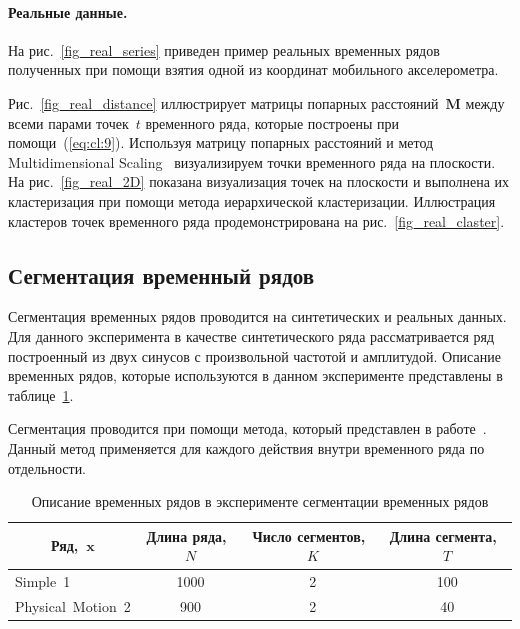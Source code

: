 \paragraph{Реальные данные.}

На рис.~\ref{fig_real_series} приведен пример реальных временных рядов полученных при помощи взятия одной из координат мобильного акселерометра. 

Рис.~\ref{fig_real_distance} иллюстрирует матрицы попарных расстояний~$\textbf{M}$ между всеми парами точек~$t$ временного ряда, которые построены при помощи~(\ref{eq:cl:9}). 
Используя матрицу попарных расстояний и метод Multidimensional Scaling~\cite{Borg2005} визуализируем точки временного ряда на плоскости. 
На рис.~\ref{fig_real_2D} показана визуализация точек на плоскости и выполнена их кластеризация при помощи метода иерархической кластеризации. 
Иллюстрация кластеров точек временного ряда продемонстрирована на рис.~\ref{fig_real_claster}.

\subsection{Сегментация временный рядов}
Сегментация временных рядов проводится на синтетических и реальных данных. Для данного эксперимента в качестве синтетического ряда рассматривается ряд построенный из двух синусов с произвольной частотой и амплитудой. Описание временных рядов, которые используются в данном эксперименте представлены в таблице~\ref{table:3}.

Сегментация проводится при помощи метода, который представлен в работе~\cite{motrenko2015}. Данный метод применяется для каждого действия внутри временного ряда по отдельности.


\begin{table}[h!t]
\begin{center}
\caption{Описание временных рядов в эксперименте сегментации временных рядов}
\label{table:3}
\begin{tabular}{|c|c|c|c|}
\hline
	Ряд,~$\textbf{x}$ &Длина ряда,~$N$& Число сегментов,~$K$&Длина сегмента,~$T$\\
	\hline
	\multicolumn{1}{|l|}{Simple~1}
	& 1000& 2& 100\\
	\hline
	\multicolumn{1}{|l|}{Physical~Motion~2}
	& 900& 2& 40\\
\hline

\end{tabular}
\end{center}
\end{table}

